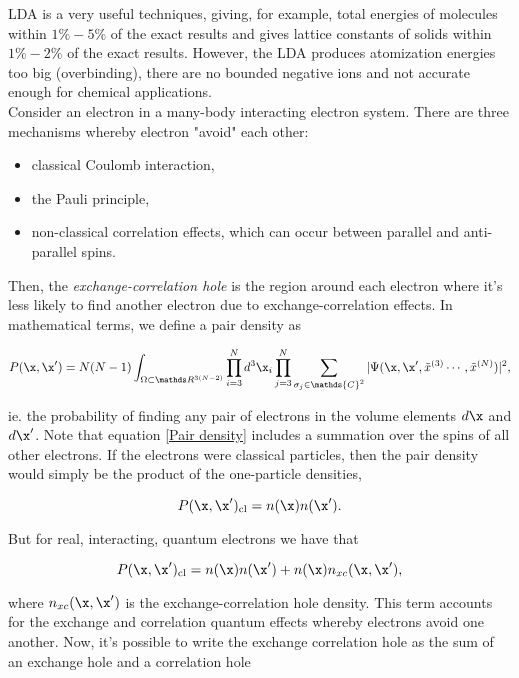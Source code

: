 \documentclass{homework}
\begin{document}
LDA is a very useful techniques, giving, for example, total energies of molecules within $1\% - 5\%$ of the exact results and gives lattice constants of solids within $1\% - 2\%$ of the exact results. However, the LDA produces atomization energies too big (overbinding), there are no bounded negative ions and not accurate enough for chemical applications. \\

Consider an electron in a many-body interacting electron system. There are three mechanisms whereby electron "avoid" each other:

\begin{itemize}
    \item classical Coulomb interaction, 
    \item the Pauli principle, 
    \item non-classical correlation effects, which can occur between parallel and anti-parallel spins. 
\end{itemize}

Then, the \textit{exchange-correlation hole} is the region around each electron where it's less likely to find another electron due to exchange-correlation effects. In mathematical terms, we define a pair density as 

\begin{equation}
    P(\x, \x') = N(N-1) \int_{\Omega \subset \R^{3(N-2)}} \prod_{i=3}^{N} d^{3}\x_i \prod_{j=3}^{N} \sum_{\sigma_j \in \mathds{C}^2} |\Psi(\x, \x', \tilde{x}^{(3)}\cdots, \tilde{x}^{(N)})|^2,
    \label{Pair density}
\end{equation}

ie. the probability of finding any pair of electrons in the volume elements $d\x$ and $d\x'$. Note that equation \eqref{Pair density} includes a summation over the spins of all other electrons. If the electrons were classical particles, then the pair density would simply be the product of the one-particle densities,

$$
P(\x, \x')_{\textnormal{cl}} = n(\x)n(\x').
$$

But for real, interacting, quantum electrons we have that 

$$
P(\x, \x')_{\textnormal{cl}} = n(\x)n(\x') + n(\x) n_{xc}(\x, \x'),
$$

where $n_{xc}(\x, \x')$ is the exchange-correlation hole density. This term accounts for the exchange and correlation quantum effects whereby electrons avoid one another. Now, it's possible to write the exchange correlation hole as the sum of an exchange hole and a correlation hole 
\end{document}
